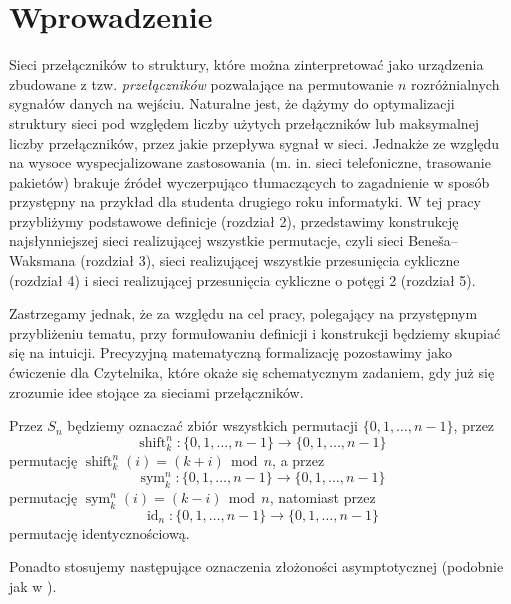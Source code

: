 \documentclass[a4paper]{article}
\renewcommand{\mod}{\, \operatorname{mod} \,}
\newcommand{\shift}[2]{\operatorname{shift}_{#2}^{#1}}
\newcommand{\sym}[2]{\operatorname{sym}_{#2}^{#1}}
\newcommand{\id}[1]{\operatorname{id}_{#1}}
\theoremstyle{definition}
\begin{document}
\section{Wprowadzenie}

Sieci przełączników to struktury, które można zinterpretować jako urządzenia zbudowane z tzw. \textit{przełączników} pozwalające na permutowanie \(n\) rozróżnialnych sygnałów danych na wejściu. Naturalne jest, że dążymy do optymalizacji struktury sieci pod względem liczby użytych przełączników lub maksymalnej liczby przełączników, przez jakie przepływa sygnał w sieci. Jednakże ze względu na wysoce wyspecjalizowane zastosowania (m. in. sieci telefoniczne, trasowanie pakietów) brakuje źródeł wyczerpująco tłumaczących to zagadnienie w sposób przystępny na przykład dla studenta drugiego roku informatyki. W tej pracy przybliżymy podstawowe definicje (rozdział 2), przedstawimy konstrukcję najsłynniejszej sieci realizującej wszystkie permutacje, czyli sieci Beneša--Waksmana (rozdział 3), sieci realizującej wszystkie przesunięcia cykliczne (rozdział 4) i sieci realizującej przesunięcia cykliczne o potęgi 2 (rozdział 5).  

\vspace{1em}

Zastrzegamy jednak, że za względu na cel pracy, polegający na przystępnym przybliżeniu tematu, przy formułowaniu definicji i konstrukcji będziemy skupiać się na intuicji. Precyzyjną matematyczną formalizację pozostawimy jako ćwiczenie dla Czytelnika, które okaże się schematycznym zadaniem, gdy już się zrozumie idee stojące za sieciami przełączników. 

\vspace{1em}

Przez \(S_n\) będziemy oznaczać zbiór wszystkich permutacji \(\{0, 1, \ldots, n-1\}\), przez
\[
\shift{n}{k} : \{0, 1, \ldots, n-1\} \to \{0, 1, \ldots, n-1\} 
\]
permutację \(\shift{n}{k}(i) = (k+i) \mod n\), a przez
\[
\sym{n}{k} : \{0, 1, \ldots, n-1\} \to \{0, 1, \ldots, n-1\} 
\]
permutację \(\sym{n}{k}(i) = (k-i) \mod n\), natomiast przez 
\[
\id{n} : \{0, 1, \ldots, n-1\} \to \{0, 1, \ldots, n-1\} 
\]
permutację identycznościową. 

\vspace{1em}

Ponadto stosujemy następujące oznaczenia złożoności asymptotycznej (podobnie jak w \cite{cormen}).
\end{document}
